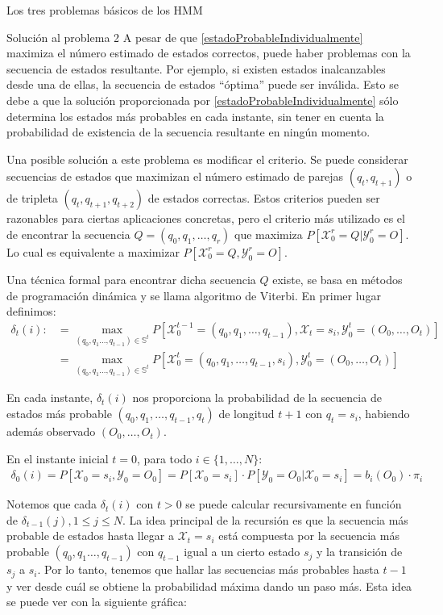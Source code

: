 \begin{section}{Los tres problemas básicos de los HMM}
\begin{subsection}{Solución al problema 2}
A pesar de que \eqref{estadoProbableIndividualmente} maximiza el número estimado de estados correctos, puede haber problemas con la secuencia de estados resultante. Por ejemplo, si existen estados inalcanzables desde una de ellas, la secuencia de estados \enquote{óptima} puede ser inválida. Esto se debe a que la solución proporcionada por \eqref{estadoProbableIndividualmente} sólo determina los estados más probables en cada instante, sin tener en cuenta la probabilidad de existencia de la secuencia resultante en ningún momento. 

Una posible solución a este problema es modificar el criterio. Se puede considerar secuencias de estados que maximizan el número estimado de parejas $(q_t,q_{t+1})$ o de tripleta $(q_t,q_{t+1},q_{t+2})$ de estados correctas. Estos criterios pueden ser razonables para ciertas aplicaciones concretas, pero el criterio más utilizado es el de encontrar la secuencia $Q=(q_0, q_1, \dots, q_r)$ que maximiza $P[\mathcal{X}_0^r=Q|\mathcal{Y}_0^r=O]$. Lo cual es equivalente a maximizar $P[\mathcal{X}_0^r=Q,\mathcal{Y}_0^r=O]$.

Una técnica formal para encontrar dicha secuencia $Q$ existe, se basa en métodos de programación dinámica y se llama algoritmo de Viterbi. En primer lugar definimos:
\[
\begin{aligned}
    \delta_t(i):&=\max_{(q_0,q_1\dots,q_{t-1})\in\mathbb{S}^t}P[\mathcal{X}_0^{t-1}=(q_0,q_1,\dots,q_{t-1}),\mathcal{X}_t=s_i,\mathcal{Y}_0^t=(O_0,\dots,O_t)]\\
    &=\max_{(q_0,q_1\dots,q_{t-1})\in\mathbb{S}^t}P[\mathcal{X}_0^{t}=(q_0,q_1,\dots,q_{t-1},s_i),\mathcal{Y}_0^t=(O_0,\dots,O_t)]
\end{aligned}
\]

En cada instante, $\delta_t(i)$ nos proporciona la probabilidad de la secuencia de estados más probable $(q_0,q_1,\dots,q_{t-1},q_t)$ de longitud $t+1$ con $q_t=s_i$, habiendo además observado $(O_0,\dots,O_t)$. 

En el instante inicial $t=0$, para todo $i\in\{1,\dots,N\}$:
\[
\begin{aligned}
    \delta_0(i)=P[\mathcal{X}_0=s_i,\mathcal{Y}_0=O_0]=P[\mathcal{X}_0=s_i]\cdot P[\mathcal{Y}_0=O_0|\mathcal{X}_0=s_i]=b_i(O_0)\cdot\pi_i
\end{aligned}
\]

Notemos que cada $\delta_t(i)$ con $t>0$ se puede calcular recursivamente en función de $\delta_{t-1}(j),1\leq j\leq N$. La idea principal de la recursión es que la secuencia más probable de estados hasta llegar a $\mathcal{X}_t=s_i$ está compuesta por la secuencia más probable $(q_0,q_1\dots,q_{t-1})$ con $q_{t-1}$ igual a un cierto estado $s_j$ y la transición de $s_j$ a $s_i$. Por lo tanto, tenemos que hallar las secuencias más probables hasta $t-1$ y ver desde cuál se obtiene la probabilidad máxima dando un paso más. Esta idea se puede ver con la siguiente gráfica:




\end{subsection}

\end{section}
